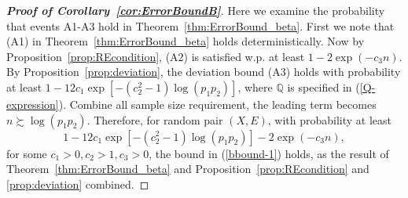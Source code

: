 \begin{proof}[\textbf{Proof of Corollary~\ref{cor:ErrorBoundB}}]
Here we examine the probability that events A1-A3 hold in Theorem~\ref{thm:ErrorBound_beta}. First we note that (A1) in Theorem~\ref{thm:ErrorBound_beta} holds deterministically. Now by Proposition~\ref{prop:REcondition}, (A2) is satisfied w.p. at least $1-2\exp(-c_3n)$. By Proposition~\ref{prop:deviation}, the deviation bound (A3) holds with probability at least $1-12c_1\exp[-(c_2^2-1)\log(p_1p_2)]$, where $\mathbb{Q}$ is specified in (\ref{Q-expression}). Combine all sample size requirement, the leading term becomes $n\succsim \log(p_1p_2)$. Therefore, for random pair $(X,E)$, with probability at least 
\begin{equation*}
1-12c_1\exp[-(c_2^2-1)\log (p_1p_2)] -  2\exp(-c_3n),
\end{equation*}
for some $c_1>0,c_2>1,c_3>0$, the bound in (\ref{bbound-1}) holds, as the result of Theorem~\ref{thm:ErrorBound_beta} and Proposition~\ref{prop:REcondition} and \ref{prop:deviation} combined. 
\end{proof}